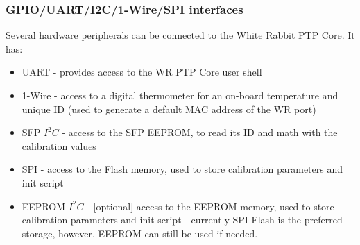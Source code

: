 \subsubsection{GPIO/UART/I2C/1-Wire/SPI interfaces}
\label{sec:wrpc_periph}


Several hardware peripherals can be connected to the White Rabbit PTP Core. It
has:
\begin{itemize}
  \item UART - provides access to the WR PTP Core user shell
  \item 1-Wire - access to a digital thermometer for an on-board temperature and
    unique ID (used to generate a default MAC address of the WR port)
  \item SFP $I^2C$ - access to the SFP EEPROM, to read its ID and math with the
    calibration values
  \item SPI - access to the Flash memory, used to store calibration
    parameters and init script
  \item EEPROM $I^2C$ - [optional] access to the EEPROM memory, used to store
    calibration parameters and init script - currently SPI Flash is the
    preferred storage, however, EEPROM can still be used if needed.
\end{itemize}
